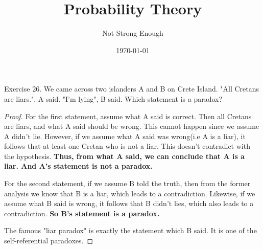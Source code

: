 \documentclass[UTF8, a4paper, linespread=1.5]{article}
\title{Probability Theory}
\date{\today}
\author{Not Strong Enough}
\begin{document}
\maketitle

\begin{thm}{Exercise 26.}{}
    We came across two islanders A and B on Crete Island. "All Cretans are liars.", A said. "I'm lying", B said. Which statement is a paradox?
\end{thm}

\begin{proof}
    For the first statement, assume what A said is correct. Then all Cretans are liars, and what A said should be wrong. This cannot happen since we assume A didn't lie. However, if we assume what A said was wrong(i.e A is a liar), it follows that at least one Cretan who is not a liar. This doesn't contradict with the hypothesis. \textbf{Thus, from what A said, we can conclude that A is a liar. And A's statement is not a paradox.}
    
    For the second statement, if we assume B told the truth, then from the former analysis we know that B is a liar, which leads to a contradiction. Likewise, if we assume what B said is wrong, it follows that B didn't lies, which also leads to a contradiction. \textbf{So B's statement is a paradox.}
    
    The famous "liar paradox" is exactly the statement which B said. It is one of the self-referential paradoxes.
\end{proof}
\end{document}

